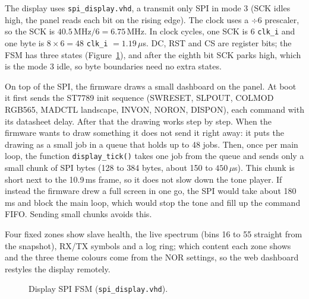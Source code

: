 \documentclass[a4paper,10pt]{article}
\begin{document}
The display uses \texttt{spi\_display.vhd}, a transmit only SPI in mode 3 (SCK idles high,
the panel reads each bit on the rising edge). The clock uses a $\div6$ prescaler, so the
SCK is $40.5\,\mathrm{MHz}/6 = 6.75$\,MHz. In clock cycles, one SCK is 6 \texttt{clk\_i} and
one byte is $8\times6 = 48$ \texttt{clk\_i} $= 1.19\,\mu$s. DC, RST and CS are register
bits; the FSM has three states (Figure~\ref{fig:disp-fsm}), and after the eighth bit SCK
parks high, which is the mode 3 idle, so byte boundaries need no extra states.

On top of the SPI, the firmware draws a small dashboard on the panel. At boot it first
sends the ST7789 init sequence (SWRESET, SLPOUT, COLMOD RGB565, MADCTL landscape, INVON,
NORON, DISPON), each command with its datasheet delay. After that the drawing works step by
step. When the firmware wants to draw something it does not send it right away: it puts the
drawing as a small job in a queue that holds up to 48 jobs. Then, once per main loop, the
function \texttt{display\_tick()} takes one job from the queue and sends only a small chunk
of SPI bytes (128 to 384 bytes, about 150 to $450\,\mu$s). This chunk is short next to the
10.9\,ms frame, so it does not slow down the tone player. If instead the firmware drew a
full screen in one go, the SPI would take about 180\,ms and block the main loop, which would
stop the tone and fill up the command FIFO. Sending small chunks avoids this.

Four fixed zones show slave health, the live spectrum
(bins 16 to 55 straight from the snapshot), RX/TX symbols and a log ring; which
content each zone shows and the three theme colours come from the NOR settings, so
the web dashboard restyles the display remotely.

\begin{figure}[H]
\centering
{}
\caption{Display SPI FSM (\texttt{spi\_display.vhd}).}
\label{fig:disp-fsm}
\end{figure}
\end{document}
